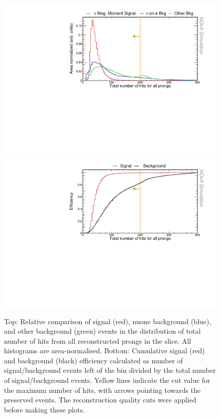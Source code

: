 \begin{figure}[hbtp]
\centering
\includegraphics[width=.9\textwidth]{Plots/NuMMEventSelection/N1Cut_NHits.pdf}
\includegraphics[width=.9\textwidth]{Plots/NuMMEventSelection/NuMM_N1Cut_NHitsleft_Eff.pdf}
\caption[Number of hits cut for basic event selection]{Top: Relative comparison of signal (red), \acrshort{nuone} background (blue), and other background (green) events in the distribution of total number of hits from all reconstructed prongs in the slice. All histograms are area-normalised. Bottom: Cumulative signal (red) and background (black) efficiency calculated as number of signal/background events left of the bin divided by the total number of signal/background events. Yellow lines indicate the cut value for the maximum number of hits, with arrows pointing towards the preserved events. The reconstruction quality cuts were applied before making these plots.}
\label{fig:NuMMCutsNHits}
\end{figure}

